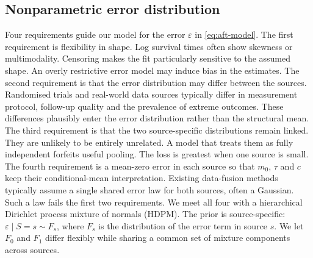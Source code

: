 \subsection{Nonparametric error distribution}

Four requirements guide our model for the error $\varepsilon$ in \eqref{eq:aft-model}.
The first requirement is flexibility in shape.
Log survival times often show skewness or multimodality.
Censoring makes the fit particularly sensitive to the assumed shape.
An overly restrictive error model may induce bias in the estimates.
The second requirement is that the error distribution may differ between the sources.
Randomised trials and real-world data sources typically differ in measurement protocol, follow-up quality and the prevalence of extreme outcomes.
These differences plausibly enter the error distribution rather than the structural mean.
The third requirement is that the two source-specific distributions remain linked.
They are unlikely to be entirely unrelated.
A model that treats them as fully independent forfeits useful pooling.
The loss is greatest when one source is small.
The fourth requirement is a mean-zero error in each source so that $m_0$, $\tau$ and $c$ keep their conditional-mean interpretation.
Existing data-fusion methods typically assume a single shared error law for both sources, often a Gaussian.
Such a law fails the first two requirements.
We meet all four with a hierarchical Dirichlet process mixture of normals (HDPM).
The prior is source-specific: $\varepsilon \mid S = s \sim F_s$, where $F_s$ is the distribution of the error term in source $s$.
We let $F_0$ and $F_1$ differ flexibly while sharing a common set of mixture components across sources.

